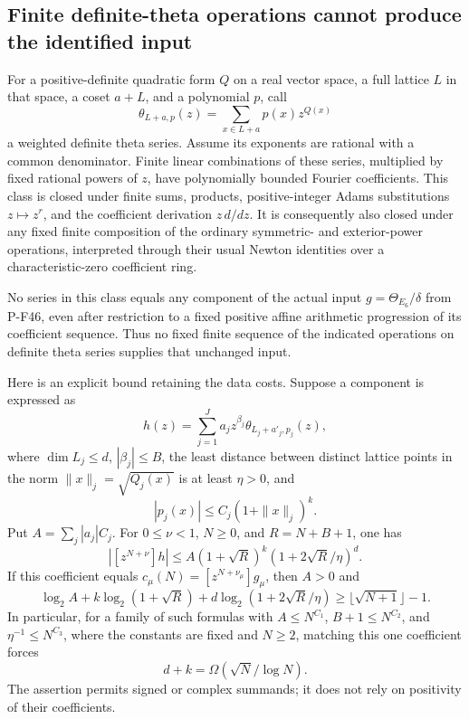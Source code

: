 \subsection{Finite definite-theta operations cannot produce the identified input}

\begin{proposition}
\label{prop:finitethetagrowth}
For a positive-definite quadratic form $Q$ on a real vector space,
a full lattice $L$ in that space, a coset $a+L$, and a polynomial
$p$, call
\[
       \theta_{L+a,p}(z)=\sum_{x\in L+a}p(x)z^{Q(x)}
                                                        \tag{P-F68a}
\]
a weighted definite theta series.  Assume its exponents are rational
with a common denominator.  Finite linear combinations of these series,
multiplied by fixed rational powers of $z$, have polynomially bounded
Fourier coefficients.  This class is closed under finite sums,
products, positive-integer Adams substitutions $z\mapsto z^r$, and
the coefficient derivation $z\,d/dz$.  It is consequently also closed
under any fixed finite composition of the ordinary symmetric- and
exterior-power operations, interpreted through their usual Newton
identities over a characteristic-zero coefficient ring.

No series in this class equals any component of the actual input
$g=\Theta_{E_6}/\delta$ from P-F46, even after restriction to a fixed
positive affine arithmetic progression of its coefficient sequence.
Thus no fixed finite sequence of the indicated operations on definite
theta series supplies that unchanged input.

Here is an explicit bound retaining the data costs.  Suppose a component
is expressed as
\[
              h(z)=\sum_{j=1}^J a_j z^{\beta_j}
                       \theta_{L_j+a'_j,p_j}(z),
                                                        \tag{P-F68b}
\]
where $\dim L_j\le d$, $|\beta_j|\le B$, the least distance between
distinct lattice points in the norm $\|x\|_j=\sqrt{Q_j(x)}$ is at
least $\eta>0$, and
\[
              |p_j(x)|\le C_j(1+\|x\|_j)^k.
\]
Put $A=\sum_j|a_j|C_j$.  For $0\le\nu<1$, $N\ge0$, and
$R=N+B+1$, one has
\[
 |[z^{N+\nu}]h|
 \le A(1+\sqrt R)^k(1+2\sqrt R/\eta)^d.                \tag{P-F68c}
\]
If this coefficient equals $c_\mu(N)=[z^{N+\nu_\mu}]g_\mu$, then
$A>0$ and
\[
 \log_2 A+k\log_2(1+\sqrt R)
       +d\log_2(1+2\sqrt R/\eta)
              \ge\lfloor\sqrt{N+1}\rfloor-1.           \tag{P-F68d}
\]
In particular, for a family of such formulas with
$A\le N^{C_1}$, $B+1\le N^{C_2}$, and
$\eta^{-1}\le N^{C_3}$, where the constants are fixed and $N\ge2$,
matching this one coefficient forces
\[
                     d+k=\Omega(\sqrt N/\log N).
                                                        \tag{P-F68e}
\]
The assertion permits signed or complex summands; it does not rely on
positivity of their coefficients.
\end{proposition}


